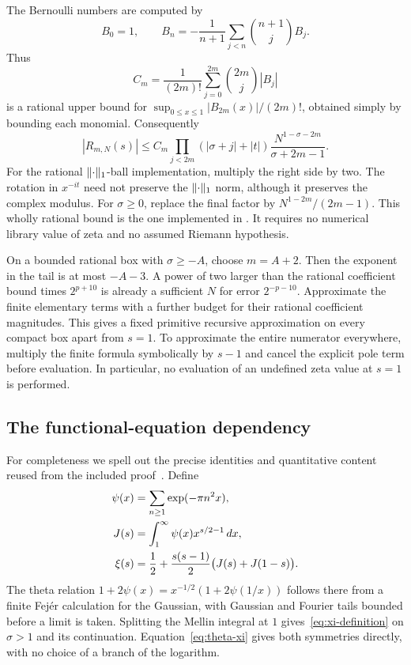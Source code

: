 The Bernoulli numbers are computed by
\[
 B_0=1,\qquad
 B_n=-\frac1{n+1}\sum_{j<n}\binom{n+1}{j}B_j.
\]
Thus
\begin{equation}
 C_m=\frac1{(2m)!}\sum_{j=0}^{2m}\binom{2m}{j}|B_j|
 \label{eq:bernoulli-bound}
\end{equation}
is a rational upper bound for
$\sup_{0\le x\le1}|B_{2m}(x)|/(2m)!$, obtained simply by bounding
each monomial. Consequently
\begin{equation}
 |R_{m,N}(s)|\le
 C_m\prod_{j<2m}(|\sigma+j|+|t|)
 \frac{N^{1-\sigma-2m}}{\sigma+2m-1}.
 \label{eq:em-bound}
\end{equation}
For the rational $\lVert \cdot\rVert_1$-ball implementation, multiply the
right side by two. The rotation in $x^{-it}$ need not preserve the
$\lVert \cdot\rVert_1$ norm, although it preserves the complex modulus.
For $\sigma\ge0$, replace the final factor by
$N^{1-2m}/(2m-1)$. This wholly rational bound is the one implemented in
. It requires no numerical library value of
zeta and no assumed Riemann hypothesis.

On a bounded rational box with $\sigma\ge-A$, choose $m=A+2$.
Then the exponent in the tail is at most $-A-3$. A power of two larger
than the rational coefficient bound times $2^{p+10}$ is already a
sufficient $N$ for error $2^{-p-10}$. Approximate the finite elementary
terms with a further budget for their rational coefficient magnitudes.
This gives a fixed primitive recursive approximation on every compact
box apart from $s=1$. To approximate the entire numerator everywhere,
multiply the finite formula symbolically by $s-1$ and cancel the
explicit pole term before evaluation. In particular, no evaluation of
an undefined zeta value at $s=1$ is performed.

\subsection{The functional-equation dependency}
For completeness we spell out the precise identities and quantitative
content reused from the included proof~\cite{RepoFE}. Define
\begin{align}
 \psi(x)&=\sum_{n\ge1}\exp(-\pi n^2x),\notag\\
 J(s)&=\int_1^\infty\psi(x)x^{s/2-1}\,dx,\notag\\
 \xi(s)&=\frac12+\frac{s(s-1)}2\bigl(J(s)+J(1-s)\bigr).
 \label{eq:theta-xi}
\end{align}
The theta relation
$1+2\psi(x)=x^{-1/2}(1+2\psi(1/x))$ follows there from a finite
Fej\'er calculation for the Gaussian, with Gaussian and Fourier tails
bounded before a limit is taken. Splitting the Mellin integral at $1$
gives~\eqref{eq:xi-definition} on $\sigma>1$ and its continuation.
Equation~\eqref{eq:theta-xi} gives both symmetries directly, with no
choice of a branch of the logarithm.

